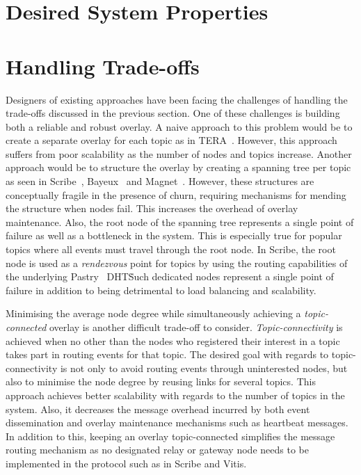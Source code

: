 \section{Desired System Properties}

\section{Handling Trade-offs}

Designers of existing approaches have been facing the challenges of
handling the trade-offs discussed in the previous section. One of these
challenges is building both a reliable and robust overlay. A naive
approach to this problem would be to create a separate overlay for each
topic as in TERA~\cite{Baldoni:2007}. However, this approach suffers from
poor scalability as the number of nodes and topics increase. Another
approach would be to structure the overlay by creating a spanning tree
per topic as seen in Scribe~\cite{Castro:2002}, Bayeux~\cite{Zhuang:2001}
and Magnet~\cite{Girdzijauskas:2010}. However, these structures are
conceptually fragile in the presence of churn, requiring mechanisms for
mending the structure when nodes fail. This increases the overhead of overlay
maintenance.  Also, the root node of the spanning tree represents a
single point of failure as well as a bottleneck in the system. This is
especially true for popular topics where all events must travel through
the root node. In Scribe, the root node is used as a \emph{rendezvous}
point for topics by using the routing capabilities of the underlying
Pastry~\cite{Rowstron:2001} DHT\. Such dedicated nodes represent a
single point of failure in addition to being detrimental to load
balancing and scalability.

Minimising the average node degree while simultaneously achieving a
\emph{topic-connected} overlay is another difficult trade-off to
consider. \emph{Topic-connectivity} is achieved when no other than the
nodes who registered their interest in a topic takes part in routing
events for that topic. The desired goal with regards to
topic-connectivity is not only to avoid routing events through
uninterested nodes, but also to minimise the node degree by reusing
links for several topics. This approach achieves better scalability with
regards to the number of topics in the system.  Also, it decreases the
message overhead incurred by both event dissemination and overlay
maintenance mechanisms such as heartbeat messages. In addition to this,
keeping an overlay topic-connected simplifies the message routing
mechanism as no designated relay or gateway node needs to be implemented
in the protocol such as in Scribe and Vitis.

